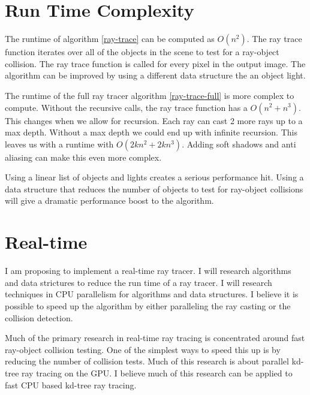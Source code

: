 \documentclass[11pt,a4paper,oneside]{article}
\begin{document}
\section{Run Time Complexity}
The runtime of algorithm \ref{ray-trace} can be computed as $O(n^2)$.    The ray trace function iterates over all of the objects in the scene to test for a ray-object collision.  The ray trace function is called for every pixel in the output image.   The algorithm can be improved by using a different data structure the an object light.

The runtime of the full ray tracer algorithm \ref{ray-trace-full} is more complex to compute.  Without the recursive calls, the ray trace function has a $O(n^2 + n^3 )$.  This changes when we allow for recursion.  Each ray can cast 2 more rays up to a max depth.  Without a max depth we could end up with infinite recursion.  This leaves us with a runtime with $O(2kn^2+2kn^3)$.  Adding soft shadows and anti aliasing can make this even more complex.

Using a linear list of objects and lights creates a serious performance hit.  Using a data structure that reduces the number of objects to test for ray-object collisions will give a dramatic performance boost to the algorithm.  


\section{Real-time}
I am proposing to implement a real-time ray tracer.  I will research algorithms and data strictures to reduce the run time of a ray tracer.  I will research techniques in CPU parallelism for algorithms and data structures.  I believe it is possible to speed up the algorithm by either paralleling the ray casting or the collision detection.

Much of the primary research in real-time ray tracing is concentrated around fast ray-object collision testing.  One of the simplest ways to speed this up is by reducing the number of collision tests\cite{kd:2005}.
Much of this research is about parallel kd-tree ray tracing on the GPU\cite{kd:2007}\cite{fkd:2007}.  I believe much of this research can be applied to fast CPU based kd-tree ray tracing\cite{kd:2006}.

\newpage
\listofalgorithms
\listoffigures


\end{document}
